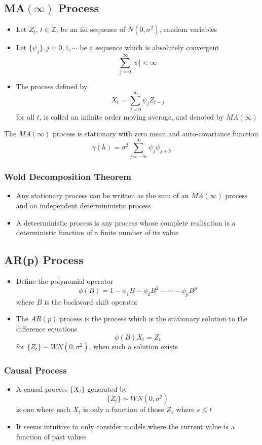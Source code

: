 \documentclass[11pt]{article}
\newcommand{\Z}{{\mathbb{Z}}}
\begin{document}
\subsection{MA$(\infty)$ Process}
\begin{itemize}
    \item Let $Z_t$, $t\in\Z$, be an iid sequence of $N(0,\sigma^2)$, random variables 
    \item Let $\{\psi_j\}, j=0,1,\cdots$ be a sequence which is absolutely convergent \[\sum_{j=0}^{\infty}|\psi|<\infty\]    
    \item The process defined by \[X_t=\sum_{j=0}^{\infty}\psi_jZ_{t-j}\]    
    for all $t$, is called an infinite order moving average, and denoted by $MA(\infty)$
\end{itemize}
The $MA(\infty)$ process is stationary with zero mean and auto-covariance function 
\[\gamma(h) = \sigma^2\sum_{j=-\infty}^{\infty}\psi_j\psi_{j+h}\]    
\subsubsection{Wold Decomposition Theorem}
\begin{itemize}
    \item Any stationary process can be written as the sum of an $MA(\infty)$ process and an independent determininistic process 
    \item A deteerministic process is any process whose complete realisation is a deterministic function of a finite number of its value 
\end{itemize}
\subsection{AR(p) Process}
\begin{itemize}
    \item Define the polynomial operator \[\phi(B)=1-\phi_1B-\phi_2B^2-\cdots-\phi_pB^p\]   where $B$ is the backward shift operator 
    \item The $AR(p)$ process is the process which is the stationary solution to the difference equations \[\phi(B)X_t=Z_t\] for $\{Z_t\}\sim WN(0,\sigma^2)$, when such a solution exists 
\end{itemize}
\subsubsection{Causal Process}
\begin{itemize}
    \item A causal process $\{X_t\}$ generated by \[\{Z_t\}\sim WN(0,\sigma^2)\] is one where each $X_t$ is only a function of those $Z_s$ where $s\leq t$ 
    \item It seems intuitive to only consider models where the current value is a function of past values 
\end{itemize}
\end{document}
